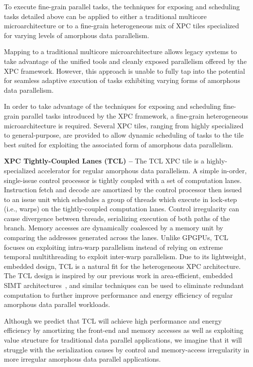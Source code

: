 To execute fine-grain parallel tasks, the techniques for exposing and
scheduling tasks detailed above can be applied to either a traditional
multicore microarchitecture or to a fine-grain heterogeneous mix of XPC
tiles specialized for varying levels of amorphous data parallelism.

Mapping to a traditional multicore microarchitecture allows legacy
systems to take advantage of the unified tools and cleanly exposed
parallelism offered by the XPC framework. However, this approach is
unable to fully tap into the potential for seamless adaptive execution of
tasks exhibiting varying forms of amorphous data parallelism.

In order to take advantage of the techniques for exposing and scheduling
fine-grain parallel tasks introduced by the XPC framework, a fine-grain
heterogeneous microarchitecture is required. Several XPC tiles, ranging
from highly specialized to general-purpose, are provided to allow dynamic
scheduling of tasks to the tile best suited for exploiting the associated
form of amorphous data parallelism.

\textbf{XPC Tightly-Coupled Lanes (TCL) --} The TCL XPC tile is a
highly-specialized accelerator for regular amorphous data parallelism. A
simple in-order, single-issue control processor is tightly coupled with a set
of computation lanes. Instruction fetch and decode are
amortized by the control processor then issued to an issue unit
which schedules a group of threads which execute in lock-step
(i.e., warps) on the tightly-coupled computation lanes. Control
irregularity can cause divergence between threads, serializing execution
of both paths of the branch. Memory accesses are dynamically coalesced by
a memory unit by comparing the addresses generated across the
lanes. Unlike GPGPUs, TCL focuses on exploiting intra-warp parallelism
instead of relying on extreme temporal multithreading to exploit
inter-warp parallelism. Due to its lightweight, embedded design, TCL is a
natural fit for the heterogeneous XPC architecture. The TCL design is
inspired by our previous work in area-efficient, embedded SIMT
architectures~\cite{kim-simt-vstruct-isca2013}, and similar techniques
can be used to eliminate redundant computation to further improve
performance and energy efficiency of regular amorphous data parallel
workloads.

Although we predict that TCL will achieve high performance and energy
efficiency by amortizing the front-end and memory accesses as well as
exploiting value structure for traditional data parallel applications, we
imagine that it will struggle with the serialization causes by control
and memory-access irregularity in more irregular amorphous data parallel
applications.

